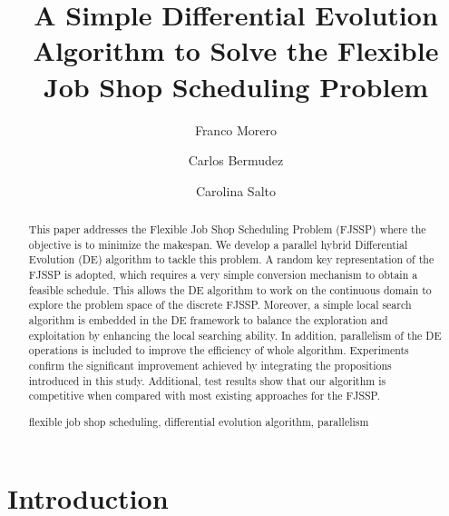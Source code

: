 \documentclass[runningheads,a4paper]{llncs}
\newcommand{\keywords}[1]{\par\addvspace\baselineskip
\noindent\keywordname\enspace\ignorespaces#1}
\begin{document}
\mainmatter  %

\title{A Simple Differential Evolution Algorithm to Solve the Flexible Job Shop Scheduling Problem}



\author{Franco Morero  \and Carlos Bermudez \and Carolina Salto }



\maketitle


\begin{abstract}
This paper addresses the Flexible Job Shop Scheduling Problem (FJSSP) where the objective is to minimize the makespan. We develop a parallel hybrid Differential Evolution (DE) algorithm to tackle this problem. A random key representation of the FJSSP is adopted, which requires a very simple conversion mechanism to obtain a feasible schedule. This allows the DE algorithm to work on the continuous domain to explore the problem space of the discrete FJSSP. Moreover, a simple local search algorithm is embedded in the DE framework to balance the exploration and exploitation by enhancing the local searching ability. In addition, parallelism of the DE operations is included to improve the efficiency of whole algorithm. Experiments confirm the significant improvement achieved by integrating the propositions introduced in this study. Additional, test results show that our algorithm is competitive when compared with most existing approaches for the FJSSP. 
\keywords{flexible job shop scheduling, differential evolution algorithm, parallelism}
\end{abstract}


\section{Introduction}
\vspace{-0.4cm}
\end{document}
